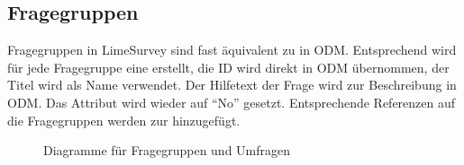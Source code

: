\subsection{Fragegruppen}
\label{m:qg}
Fragegruppen in LimeSurvey sind fast äquivalent zu  in ODM.
Entsprechend wird für jede Fragegruppe eine  erstellt, die ID wird direkt in ODM übernommen, der Titel wird als Name verwendet.
Der Hilfetext der Frage wird zur Beschreibung in ODM.
Das Attribut  wird wieder auf \enquote{No} gesetzt. %
Entsprechende Referenzen auf die Fragegruppen werden zur  hinzugefügt.

\begin{figure}[h]
		\caption{Diagramme für Fragegruppen und Umfragen}
\end{figure}

